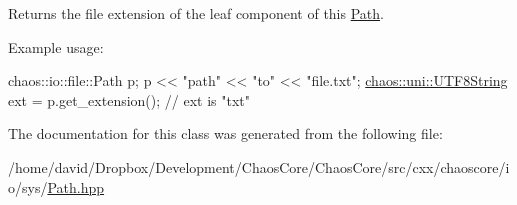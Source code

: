 Returns the file extension of the leaf component of this \hyperlink{classchaos_1_1io_1_1sys_1_1_path}{Path}. 

Example usage\-:


\begin{DoxyCode}
chaos::io::file::Path p;
p << \textcolor{stringliteral}{"path"} << \textcolor{stringliteral}{"to"} << \textcolor{stringliteral}{"file.txt"};
\hyperlink{classchaos_1_1uni_1_1_u_t_f8_string}{chaos::uni::UTF8String} ext = p.get\_extension();
\textcolor{comment}{// ext is "txt"}
\end{DoxyCode}
 

The documentation for this class was generated from the following file\-:\begin{DoxyCompactItemize}
\item 
/home/david/\-Dropbox/\-Development/\-Chaos\-Core/\-Chaos\-Core/src/cxx/chaoscore/io/sys/\hyperlink{_path_8hpp}{Path.\-hpp}\end{DoxyCompactItemize}

